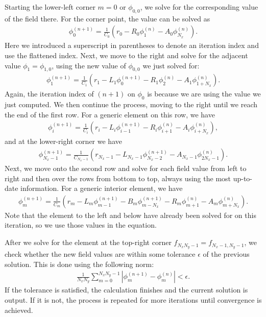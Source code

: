 Starting the lower-left corner $m = 0$ or $\phi_{0,0}$, we solve for the corresponding value of the field there. For the corner point, the value can be solved as
\begin{align}
  \phi_0^{(n+1)} = \frac{1}{C_0} \left( r_0 - R_0 \phi_1^{(n)} - A_0 \phi_{N_x}^{(n)} \right) .
\end{align}
Here we introduced a superscript in parentheses to denote an iteration index and use the flattened index. Next, we move to the right and solve for the adjacent value $\phi_1 = \phi_{1,0}$, using the new value of $\phi_{0,0}$ we just solved for:
\begin{align}
  \phi_1^{(n+1)} = \frac{1}{C_1} \left( r_1 - L_1 \phi_0^{(n+1)} - R_1 \phi_2^{(n)} - A_1 \phi_{1+N_x}^{(n)} \right) .
\end{align}
Again, the iteration index of $(n+1)$ on $\phi_0$ is because we are using the value we just computed. We then continue the process, moving to the right until we reach the end of the first row. For a generic element on this row, we have
\begin{align}
  \phi_{i}^{(n+1)} = \frac{1}{C_i} \left( r_i - L_i \phi_{i-1}^{(n+1)} - R_i \phi_{i+1}^{(n)} - A_i \phi_{i+N_x}^{(n)} \right) ,
\end{align}
and at the lower-right corner we have
\begin{align}
  \phi_{N_x-1}^{(n+1)} = \frac{1}{C_{N_x-1}} \left( r_{N_x-1} - L_{N_x-1} \phi_{N_x-2}^{(n+1)} - A_{N_x-1} \phi_{2N_x-1}^{(n)} \right) .
\end{align}
Next, we move onto the second row and solve for each field value from left to right and then over the rows from bottom to top, always using the most up-to-date information. For a generic interior element, we have
\begin{align}
  \phi_m^{(n+1)} = \frac{1}{C_m} \left( r_m - L_m \phi_{m-1}^{(n+1)} - B_m \phi_{m-N_x}^{(n+1)} - R_{m} \phi_{m+1}^{(n)} - A_{m} \phi_{m+N_x}^{(n)} \right) .
\end{align}
Note that the element to the left and below have already been solved for on this iteration, so we use those values in the equation.

After we solve for the element at the top-right corner $f_{N_x N_y-1} = f_{N_x-1,N_y-1}$, we check whether the new field values are within some tolerance $\epsilon$ of the previous solution. This is done using the following norm:
\begin{align}
  \frac{1}{N_x N_y} \sum_{m=0}^{N_x N_y - 1}  | \phi_{m}^{(n+1)} - \phi_{m}^{(n)} | < \epsilon .
\end{align} 
If the tolerance is satisfied, the calculation finishes and the current solution is output. If it is not, the process is repeated for more iterations until convergence is achieved.

